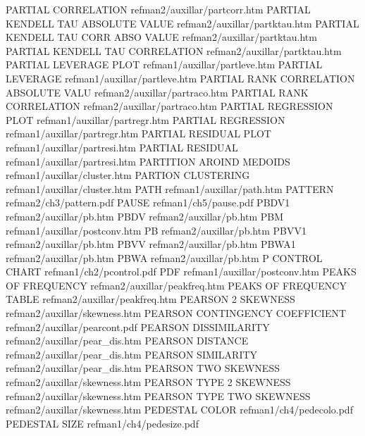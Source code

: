 PARTIAL CORRELATION                     refman2/auxillar/partcorr.htm
PARTIAL KENDELL TAU ABSOLUTE VALUE      refman2/auxillar/partktau.htm
PARTIAL KENDELL TAU CORR ABSO VALUE     refman2/auxillar/partktau.htm
PARTIAL KENDELL TAU CORRELATION         refman2/auxillar/partktau.htm
PARTIAL LEVERAGE PLOT                   refman1/auxillar/partleve.htm
PARTIAL LEVERAGE                        refman1/auxillar/partleve.htm
PARTIAL RANK CORRELATION ABSOLUTE VALU  refman2/auxillar/partraco.htm
PARTIAL RANK CORRELATION                refman2/auxillar/partraco.htm
PARTIAL REGRESSION PLOT                 refman1/auxillar/partregr.htm
PARTIAL REGRESSION                      refman1/auxillar/partregr.htm
PARTIAL RESIDUAL PLOT                   refman1/auxillar/partresi.htm
PARTIAL RESIDUAL                        refman1/auxillar/partresi.htm
PARTITION AROIND MEDOIDS                refman1/auxillar/cluster.htm
PARTION CLUSTERING                      refman1/auxillar/cluster.htm
PATH                                    refman1/auxillar/path.htm
PATTERN                                 refman2/ch3/pattern.pdf
PAUSE                                   refman1/ch5/pause.pdf
PBDV1                                   refman2/auxillar/pb.htm
PBDV                                    refman2/auxillar/pb.htm
PBM                                     refman1/auxillar/postconv.htm
PB                                      refman2/auxillar/pb.htm
PBVV1                                   refman2/auxillar/pb.htm
PBVV                                    refman2/auxillar/pb.htm
PBWA1                                   refman2/auxillar/pb.htm
PBWA                                    refman2/auxillar/pb.htm
P CONTROL CHART                         refman1/ch2/pcontrol.pdf
PDF                                     refman1/auxillar/postconv.htm
PEAKS OF FREQUENCY                      refman2/auxillar/peakfreq.htm
PEAKS OF FREQUENCY TABLE                refman2/auxillar/peakfreq.htm
PEARSON 2 SKEWNESS                      refman2/auxillar/skewness.htm
PEARSON CONTINGENCY COEFFICIENT         refman2/auxillar/pearcont.pdf
PEARSON DISSIMILARITY                   refman2/auxillar/pear_dis.htm
PEARSON DISTANCE                        refman2/auxillar/pear_dis.htm
PEARSON SIMILARITY                      refman2/auxillar/pear_dis.htm
PEARSON TWO SKEWNESS                    refman2/auxillar/skewness.htm
PEARSON TYPE 2 SKEWNESS                 refman2/auxillar/skewness.htm
PEARSON TYPE TWO SKEWNESS               refman2/auxillar/skewness.htm
PEDESTAL COLOR                          refman1/ch4/pedecolo.pdf
PEDESTAL SIZE                           refman1/ch4/pedesize.pdf
